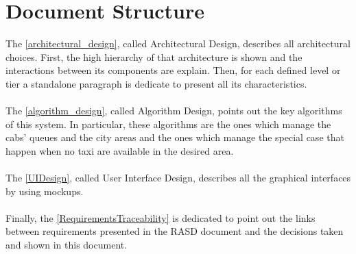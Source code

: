 \documentclass[\mainpath/main]{subfiles}
\begin{document}
\section{Document Structure}
The \autoref{architectural_design}, called Architectural Design, describes all architectural choices. First, the high hierarchy of that architecture is shown and the interactions between its components are explain. Then, for each defined level or tier a standalone paragraph is dedicate to present all its characteristics.\\
\\
The \autoref{algorithm_design}, called Algorithm Design, points out the key algorithms of this system. In particular, these algorithms are the ones which manage the cabs' queues and the city areas and the ones which manage the special case that happen when no taxi are available in the desired area.\\
\\
The \autoref{UIDesign}, called User Interface Design, describes all the graphical interfaces by using \glspl{mockup}.\\
\\
Finally, the \autoref{RequirementsTraceability} is dedicated to point out the links between requirements presented in the RASD document and the decisions taken and shown in this document.
\end{document}
